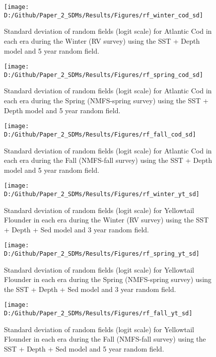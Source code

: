 \documentclass[
]{article}
\begin{document}
\begin{landscape}
\newpage

\begin{figure}
\texttt{[image: D:/Github/Paper\_2\_SDMs/Results/Figures/rf\_winter\_cod\_sd]} \caption{Standard deviation of random fields (logit scale) for Atlantic Cod  in each era during the Winter (RV survey) using the SST + Depth model and 5 year random field.}\label{fig:rf-winter-cod-sd}
\end{figure}

\newpage
\begin{figure}
\texttt{[image: D:/Github/Paper\_2\_SDMs/Results/Figures/rf\_spring\_cod\_sd]} \caption{Standard deviation of random fields (logit scale) for Atlantic Cod  in each era during the Spring (NMFS-spring survey) using the SST + Depth model and 5 year random field.}\label{fig:rf-spring-cod-sd}
\end{figure}

\newpage
\begin{figure}
\texttt{[image: D:/Github/Paper\_2\_SDMs/Results/Figures/rf\_fall\_cod\_sd]} \caption{Standard deviation of random fields (logit scale) for Atlantic Cod  in each era during the Fall (NMFS-fall survey) using the SST + Depth model and 5 year random field.}\label{fig:rf-fall-cod-sd}
\end{figure}

\newpage
\begin{figure}
\texttt{[image: D:/Github/Paper\_2\_SDMs/Results/Figures/rf\_winter\_yt\_sd]} \caption{Standard deviation of random fields (logit scale) for Yellowtail Flounder in each era during the Winter (RV survey) using the SST + Depth + Sed model and 3 year random field.}\label{fig:rf-winter-yt-sd}
\end{figure}

\newpage
\begin{figure}
\texttt{[image: D:/Github/Paper\_2\_SDMs/Results/Figures/rf\_spring\_yt\_sd]} \caption{Standard deviation of random fields (logit scale) for Yellowtail Flounder in each era during the Spring (NMFS-spring survey) using the SST + Depth + Sed model and 3 year random field.}\label{fig:rf-spring-yt-sd}
\end{figure}

\newpage
\begin{figure}
\texttt{[image: D:/Github/Paper\_2\_SDMs/Results/Figures/rf\_fall\_yt\_sd]} \caption{Standard deviation of random fields (logit scale) for Yellowtail Flounder in each era during the Fall (NMFS-fall survey) using the SST + Depth + Sed model and 5 year random field.}\label{fig:rf-fall-yt-sd}
\end{figure}
\end{landscape}
\end{document}
